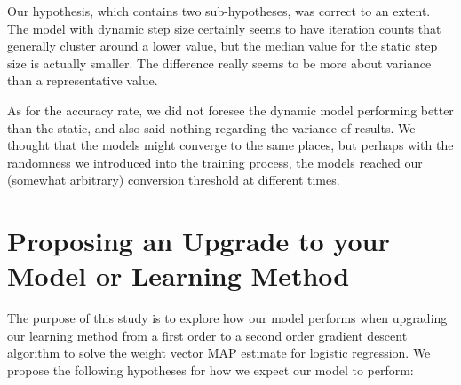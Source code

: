 \documentclass[12pt]{article}
\begin{document}
Our hypothesis, which contains two sub-hypotheses, was correct to an extent. The model with dynamic step size certainly seems to have iteration counts that generally cluster around a lower value, but the median value for the static step size is actually smaller. The difference really seems to be more about variance than a representative value.

As for the accuracy rate, we did not foresee the dynamic model performing better than the static, and also said nothing regarding the variance of results. We thought that the models might converge to the same places, but perhaps with the randomness we introduced into the training process, the models reached our (somewhat arbitrary) conversion threshold at different times.


\section{Proposing an Upgrade to your Model or Learning Method}

The purpose of this study is to explore how our model performs when upgrading our
learning method from a first order to a second order gradient descent algorithm to solve the
weight vector MAP estimate for logistic regression. We propose the following hypotheses
for how we expect our model to perform:
\end{document}
